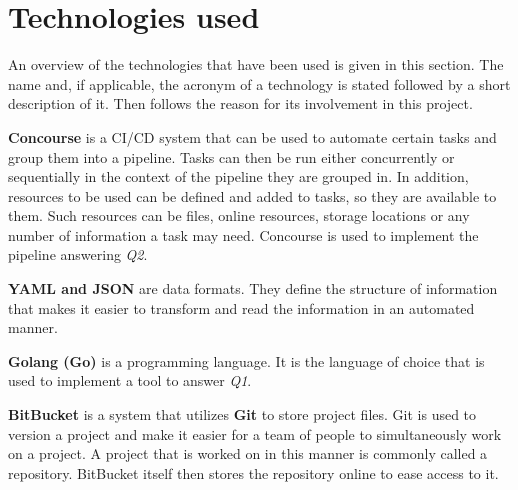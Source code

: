 \chapter{Technologies used}\label{ch:technologies-used}

An overview of the technologies that have been used is given in this section.
The name and, if applicable, the acronym of a technology is stated followed by a short description of it.
Then follows the reason for its involvement in this project.

\textbf{Concourse} is a CI/CD system that can be used to automate certain tasks and group them into a pipeline.
Tasks can then be run either concurrently or sequentially in the context of the pipeline they are grouped in.
In addition, resources to be used can be defined and added to tasks, so they are available to them.
Such resources can be files, online resources, storage locations or any number of information a task may need.
Concourse is used to implement the pipeline answering \textit{Q2}.

\textbf{YAML and JSON} are data formats.
They define the structure of information that makes it easier to transform and read the information in an automated manner.

\textbf{Golang (Go)} is a programming language.
It is the language of choice that is used to implement a tool to answer \textit{Q1}.

\textbf{BitBucket} is a system that utilizes \textbf{Git} to store project files.
Git is used to version a project and make it easier for a team of people to simultaneously work on a project.
A project that is worked on in this manner is commonly called a repository.
BitBucket itself then stores the repository online to ease access to it.
